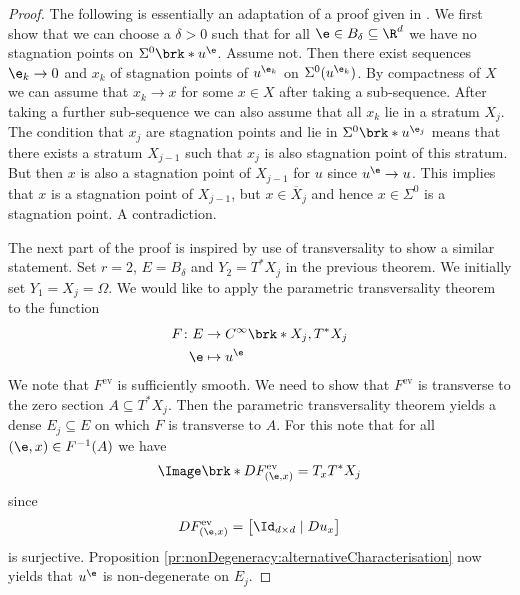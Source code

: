 \begin{proof}
  The following is essentially an adaptation of a proof given in \cite[§2]{Morse1970}.
  We first show that we can choose a $\delta>0$ such that for all $\e\in B_\delta\subseteq\R^d$ we have no stagnation points on $\Sigma^0\brk*{u^\e}$.
  Assume not. Then there exist sequences $\e_k\to0$ and $x_k$ of stagnation points of $u^{\e_k}$ on $\Sigma^0(u^{\e_k})$.
  By compactness of $X$ we can assume that $x_k\to x$ for some $x\in X$ after taking a sub-sequence.
  After taking a further sub-sequence we can also assume that all $x_k$ lie in a stratum $X_j$.
  The condition that $x_j$ are stagnation points and lie in $\Sigma^0\brk*{u^{\e_j}}$
  means that there exists a stratum $X_{j-1}$ such that $x_j$ is also stagnation point of this stratum.
  But then $x$ is also a stagnation point of $X_{j-1}$ for $u$ since $u^\e\to u$.
  This implies that $x$ is a stagnation point of $X_{j-1}$, but $x\in\overline{X}_j$ and hence $x\in\Sigma^0$
  is a stagnation point. A contradiction.

  The next part of the proof is inspired by \cite{Hirsch1994} use of transversality to show a similar statement.
  Set $r=2$, $E=B_\delta$ and $Y_2=T^*X_j$ in the previous theorem.
  We initially set $Y_1=X_j=\Omega$.
  We would like to apply the parametric transversality theorem to the function
  \begin{align*}
    F\colon E&\to C^\infty\brk*{X_j,T^*X_j} \\
    \e&\mapsto u^\e
  \end{align*}
  We note that $F^\text{ev}$ is sufficiently smooth. 
  We need to show that $F^\text{ev}$ is transverse to the
  zero section $A\subseteq T^*X_j$. Then the parametric transversality theorem 
  yields a dense $E_j\subseteq E$ on which
  $F$ is transverse to $A$.
  For this note that for all $(\e,x)\in F^{-1}(A)$ we have
  \begin{align}
    \Image\brk*{DF^\text{ev}_{(\e,x)}}=T_xT^*X_j\label{eq:nonDegeneracy:surjectiveDF}
  \end{align}
  since
  \begin{align*}
    DF^\text{ev}_{(\e,x)}=\begin{bmatrix}
      \Id_{d\times d}\mid Du_x
    \end{bmatrix}
  \end{align*}
  is surjective. 
  Proposition \ref{pr:nonDegeneracy:alternativeCharacterisation}
  now yields that $u^\e$ is non-degenerate on $E_j$.
  

\end{proof}
